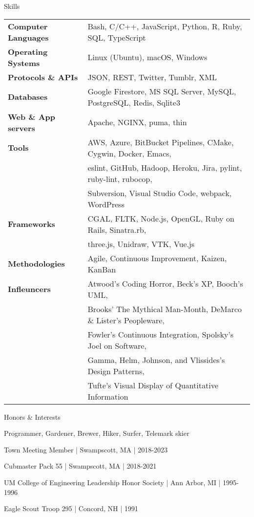 \documentclass{resume}
\begin{document}
\begin{rSection}{Skills}
\begin{tabular}{ @{} >{\bfseries}l @{\hspace{6ex}} l }
Computer Languages & Bash, C/C++, JavaScript, Python, R, Ruby, SQL, TypeScript \\
Operating Systems & Linux (Ubuntu), macOS, Windows \\
Protocols \& APIs & JSON, REST, Twitter, Tumblr, XML \\
Databases & Google Firestore, MS SQL Server, MySQL, PostgreSQL, Redis, Sqlite3 \\
Web \& App servers & Apache, NGINX, puma, thin \\
Tools & AWS, Azure, BitBucket Pipelines, CMake, Cygwin, Docker, Emacs, \\
 & eslint, GitHub, Hadoop, Heroku, Jira, pylint, ruby-lint, rubocop, \\
 & Subversion, Visual Studio Code, webpack, WordPress \\
Frameworks & CGAL, FLTK, Node.js, OpenGL, Ruby on Rails, Sinatra.rb, \\
 & three.js, Unidraw, VTK, Vue.js \\
Methodologies & Agile, Continuous Improvement, Kaizen, KanBan \\
Infleuncers & Atwood's Coding Horror, Beck's XP, Booch's UML, \\
 & Brooks' The Mythical Man-Month, DeMarco \& Lister's Peopleware, \\
 & Fowler's Continuous Integration, Spolsky's Joel on Software, \\
 & Gamma, Helm, Johnson, and Vlissides's Design Patterns, \\
 & Tufte's Visual Display of Quantitative Information
\end{tabular}
\end{rSection}

\begin{rSection}{Honors \& Interests}
\item Programmer, Gardener, Brewer, Hiker, Surfer, Telemark skier
\item Town Meeting Member | Swampscott, MA | 2018-2023
\item Cubmaster Pack 55 | Swampscott, MA | 2018-2021
\item UM College of Engineering Leadership Honor Society | Ann Arbor, MI | 1995-1996
\item Eagle Scout Troop 295 | Concord, NH | 1991
\end{rSection}
\end{document}
